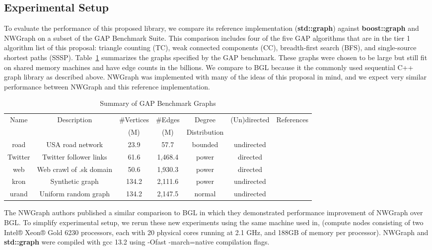 \subsection{Experimental Setup}
To evaluate the performance of this proposed library, we compare its reference implementation
(\textbf{std::graph}) against \textbf{boost::graph} and NWGraph on a subset of the GAP Benchmark Suite\cite{gapbs_2023}.
This comparison includes four of the five GAP algorithms that are in the tier 1 algorithm list of this proposal:
triangle counting (TC), weak connected components (CC), breadth-first search (BFS),
and single-source shortest paths (SSSP).
Table~\ref{tab:gap_graphs} summarizes the graphs specified by the GAP benchmark.
These graphs were chosen to be large but still fit on shared memory machines and have edge counts in the billions.
We compare to BGL because it the commonly used sequential C++ graph library as described above.
NWGraph was implemented with many of the ideas of this proposal in mind, and we expect very similar performance
between NWGraph and this reference implementation.

\begin{table}[h!]
\centering
\begin{tabular}{c c c c c c c}
Name & Description & \#Vertices & \#Edges & Degree & (Un)directed & References \\
     &             & (M)        & (M)     & Distribution & & \\\hline
road & USA road network & 23.9 & 57.7 & bounded & undirected & \cite{dimacs9th}\\\hline
Twitter & Twitter follower links & 61.6 & 1,468.4 & power & directed & \cite{Twitter}\\\hline
web & Web crawl of .sk domain & 50.6 & 1,930.3 & power & directed & \cite{LAW1}\\\hline
kron & Synthetic graph & 134.2 & 2,111.6 & power & undirected & \cite{Graph500} \\\hline
urand & Uniform random graph & 134.2 & 2,147.5 & normal & undirected & \cite{Erdos}\\\hline
\end{tabular}
\caption{Summary of GAP Benchmark Graphs}
\label{tab:gap_graphs}
\end{table}

The NWGraph authors published a similar comparison to BGL\cite{REF_nwgraph_library} in which they
demonstrated performance improvement of NWGraph over BGL.
To simplify experimental setup, we rerun these new experiments using the same machine used in\cite{REF_nwgraph_library},
(compute nodes consisting of two Intel® Xeon® Gold 6230 processors, each with 20 physical cores running at 2.1 GHz,
and 188GB of memory per processor).
NWGraph and \textbf{std::graph} were compiled with gcc 13.2 using -Ofast -march=native compilation flags.

